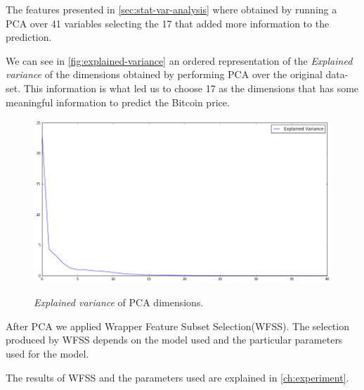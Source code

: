The features presented in \autoref{sec:stat-var-analysis} where
obtained by running a PCA over 41 variables selecting the 17 that
added more information to the prediction.

We can see in \autoref{fig:explained-variance} an ordered
representation of the \textit{Explained variance} of the dimensions
obtained by performing PCA over the original data-set. This
information is what led us to choose 17 as the dimensions that has
some meaningful information to predict the Bitcoin price.

\begin{figure}[bth]
  \myfloatalign
  {\includegraphics[width=1\linewidth]
    {gfx/explained-variance}}
  \caption{\textit{Explained variance} of PCA dimensions.}
  \label{fig:explained-variance}
\end{figure}

After PCA we applied Wrapper Feature Subset Selection(WFSS). The
selection produced by WFSS depends on the model used and the
particular parameters used for the model.

The results of WFSS and the parameters used are explained
in \autoref{ch:experiment}.



